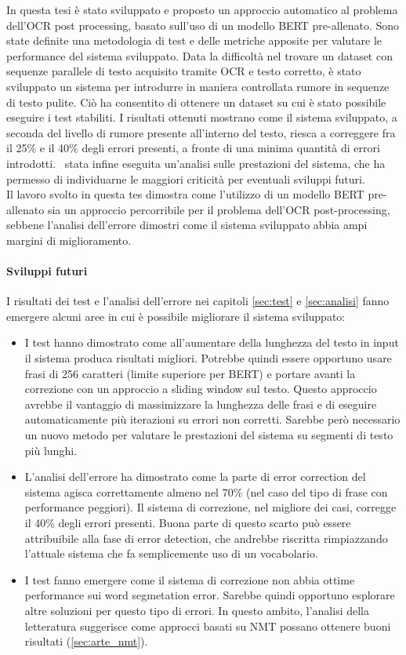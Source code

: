 In questa tesi è stato sviluppato e proposto un approccio automatico al problema dell'OCR post processing, basato sull'uso di un modello BERT pre-allenato. Sono state definite una metodologia di test e delle metriche apposite per valutare le performance del sistema sviluppato. Data la difficoltà nel trovare un dataset con sequenze parallele di testo acquisito tramite OCR e testo corretto, è stato sviluppato un sistema per introdurre in maniera controllata rumore in sequenze di testo pulite. Ciò ha consentito di ottenere un dataset su cui è stato possibile eseguire i test stabiliti. I risultati ottenuti mostrano come il sistema sviluppato, a seconda del livello di rumore presente all'interno del testo, riesca a correggere fra il 25\% e il 40\% degli errori presenti, a fronte di una minima quantità di errori introdotti. \E\ stata infine eseguita un'analisi sulle prestazioni del sistema, che ha permesso di individuarne le maggiori criticità per eventuali sviluppi futuri.\\
Il lavoro svolto in questa tes dimostra come l'utilizzo di un modello BERT pre-allenato sia un approccio percorribile per il problema dell'OCR post-processing, sebbene l'analisi dell'errore dimostri come il sistema sviluppato abbia ampi margini di miglioramento.

\paragraph{Sviluppi futuri} I risultati dei test e l'analisi dell'errore nei capitoli \ref{sec:test} e \ref{sec:analisi} fanno emergere alcuni aree in cui è possibile migliorare il sistema sviluppato:

\begin{itemize}
\item I test hanno dimostrato come all'aumentare della lunghezza del testo in input il sistema produca risultati migliori. Potrebbe quindi essere opportuno usare frasi di 256 caratteri (limite superiore per BERT) e portare avanti la correzione con un approccio a sliding window sul testo. Questo approccio avrebbe il vantaggio di massimizzare la lunghezza delle frasi e di eseguire automaticamente più iterazioni su errori non corretti. Sarebbe però necessario un nuovo metodo per valutare le prestazioni del sistema su segmenti di testo più lunghi.

\item L'analisi dell'errore ha dimostrato come la parte di error correction del sistema agisca correttamente almeno nel 70\% (nel caso del tipo di frase con performance peggiori). Il sistema di correzione, nel migliore dei casi, corregge il 40\% degli errori presenti. Buona parte di questo scarto può essere attribuibile alla fase di error detection, che andrebbe riscritta rimpiazzando l'attuale sistema che fa semplicemente uso di un vocabolario.

\item I test fanno emergere come il sistema di correzione non abbia ottime performance sui word segmetation error. Sarebbe quindi opportuno esplorare altre soluzioni per questo tipo di errori. In questo ambito, l'analisi della letteratura suggerisce come approcci basati su NMT possano ottenere buoni risultati (\autoref{sec:arte_nmt}).
\end{itemize}